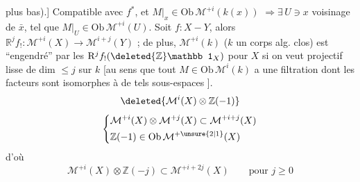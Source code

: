 plus bas).]  %
 Compatible avec %
$f^*$, et  $M|_x\in\mathrm{Ob}\,\mathcal M^{+i}(k(x))$ %
$\Longrightarrow\exists\,U\ni x$ voisinage de $\bar x$, tel que %
$M|_U\in\mathrm{Ob}\,\mathcal M^{+i}(U)$. Soit $f:X-Y$, %
alors $\mathbb R^j f_!:\mathcal M^{+i}(X)\longrightarrow\mathcal M^{i+j}(Y)$ ; de %
plus, $\mathcal M^{+i}(k)$ ($k$ un corps alg. clos) %
est ``engendré'' par les  $\mathrm R^j f_!(\deleted{\mathbb Z}\mathbb 1_X)$ pour %
$X$ si on veut projectif lisse de dim $\leq j$ sur $k$ %
[au sens que tout $M\in\mathrm{Ob}\,\mathcal M^i(k)$ a une %
filtration dont les facteurs sont isomorphes %
à de tels sous-espaces ]. %
\[
\deleted{\mathcal M^i(X)\otimes\mathbb Z(-1)} %
\]
\[
\left\{\begin{aligned}
&\mathcal M^{+i}(X)\otimes\mathcal M^{+j}(X)\subset\mathcal M^{+i+j}(X)\\ %
&\mathbb Z(-1)\in\mathrm{Ob}\,\mathcal M^{+\unsure{2|1}}(X) %
\end{aligned}\right.
\]
d'où %
\[
\mathcal M^{+i}(X)\otimes\mathbb Z(-j)\subset\mathcal M^{+i+2j}(X)\qquad\text{pour }j\geq0 %
\]

